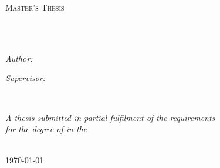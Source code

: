 \documentclass[
11pt, %
oneside, %
english, %
singlespacing, %
headsepline, %
]{structure} %
\author{Kieran \textsc{Rudd}} %
\begin{document}
\frontmatter %

\pagestyle{plain} %


\begin{titlepage}
\begin{center}

\vspace*{.06\textheight}
{\scshape\LARGE \univname\par}\vspace{1.5cm} %
\textsc{\Large Master's Thesis}\\[0.5cm] %

\HRule \\[0.4cm] %
{\huge \bfseries \ttitle\par}\vspace{0.4cm} %
\HRule \\[1.5cm] %
 
\begin{minipage}[t]{0.4\textwidth}
\begin{flushleft} \large
\emph{Author:}\\
\href{http://www.johnsmith.com}{\authorname} %
\end{flushleft}
\end{minipage}
\begin{minipage}[t]{0.4\textwidth}
\begin{flushright} \large
\emph{Supervisor:} \\
\href{http://www.jamessmith.com}{\supname} %
\end{flushright}
\end{minipage}\\[3cm]
 
\vfill

\large \textit{A thesis submitted in partial fulfilment of the requirements\\ for the degree of \degreename \textit{ in the}}\\[0.3cm] %

\deptname\\[2cm] %
 
\vfill

{\large \today}\\[4cm] %
 
\vfill
\end{center}
\end{titlepage}
\end{document}
